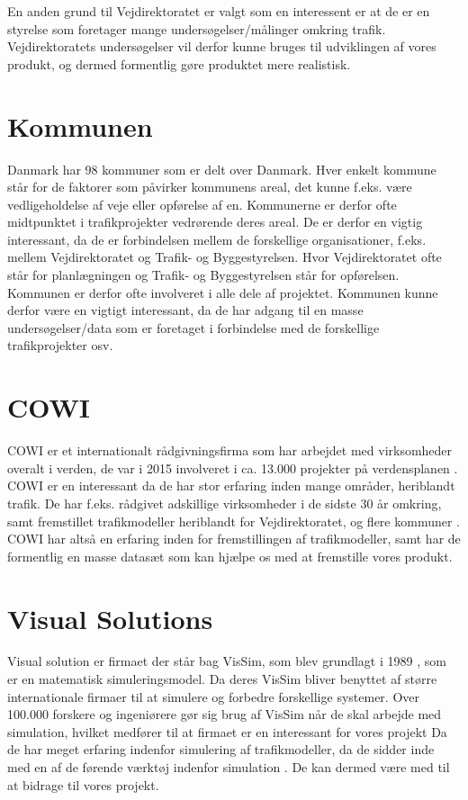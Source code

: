 En anden grund til Vejdirektoratet er valgt som en interessent er at de er en styrelse som foretager mange undersøgelser/målinger omkring trafik. Vejdirektoratets undersøgelser vil derfor kunne bruges til udviklingen af vores produkt, og dermed formentlig gøre produktet mere realistisk.

\section{Kommunen}
\label{sec:Kommunen}
Danmark har 98 kommuner som er delt over Danmark. Hver enkelt kommune står for de faktorer som påvirker kommunens areal, det kunne f.eks. være vedligeholdelse af veje eller opførelse af en. Kommunerne er derfor ofte midtpunktet i trafikprojekter vedrørende deres areal. De er derfor en vigtig interessant, da de er forbindelsen mellem de forskellige organisationer, f.eks. mellem Vejdirektoratet og Trafik- og Byggestyrelsen. Hvor Vejdirektoratet ofte står for planlægningen og Trafik- og Byggestyrelsen står for opførelsen. Kommunen er derfor ofte involveret i alle dele af projektet. Kommunen kunne derfor være en vigtigt interessant, da de har adgang til en masse undersøgelser/data som er foretaget i forbindelse med de forskellige trafikprojekter osv. 


\section{COWI}
\label{sec:COWI}
COWI er et internationalt rådgivningsfirma som har arbejdet med virksomheder overalt i verden, de var i 2015 involveret i ca. 13.000 projekter på verdensplanen \cite{OmCOWI}. COWI er en interessant da de har stor erfaring inden mange områder, heriblandt trafik. De har f.eks. rådgivet adskillige virksomheder i de sidste 30 år omkring, samt fremstillet trafikmodeller heriblandt for Vejdirektoratet, og flere kommuner \cite{TRAFIKMODELREFERENCER}. COWI har altså en erfaring inden for fremstillingen af trafikmodeller, samt har de formentlig en masse datasæt som kan hjælpe os med at fremstille vores produkt.

\section{Visual Solutions}
\label{sec:Visual Solutions}
Visual solution er firmaet der står bag VisSim, som blev grundlagt i 1989 \cite{VisualSolutions}, som er en matematisk simuleringsmodel. Da deres VisSim bliver benyttet af større internationale firmaer til at simulere og forbedre forskellige systemer. Over 100.000 forskere og ingeniørere gør sig brug af VisSim når de skal arbejde med simulation, hvilket medfører til at firmaet er en interessant for vores projekt Da de har meget erfaring indenfor simulering af trafikmodeller, da de sidder inde med en af de førende værktøj indenfor simulation \cite{VisSim}. De kan dermed være med til at bidrage til vores projekt.

